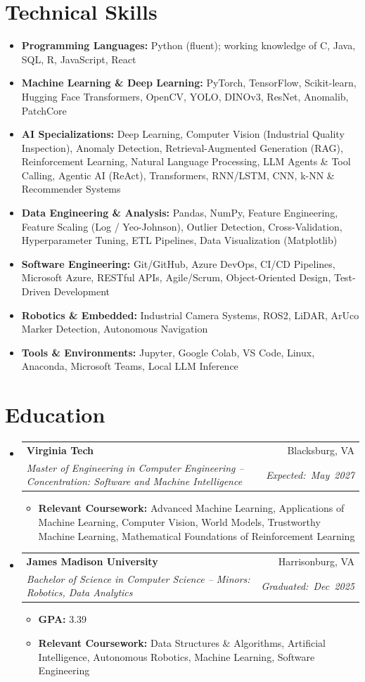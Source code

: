 \documentclass[letterpaper,10pt]{article}
\makeatletter
\newcommand{\resumeItem}[1]{\item\small{#1}}
\newcommand{\resumeSubheading}[4]{
  \vspace{1pt}\item
    \begin{tabular*}{\textwidth}[t]{@{}l@{\extracolsep{\fill}}r@{}}
      \textbf{#1} & #2 \\
      \textit{\small #3} & \textit{\small\mbox{#4}} \\
    \end{tabular*}\vspace{-2pt}
}
\newcommand{\resumeSubHeadingListStart}{\begin{itemize}[leftmargin=0pt, label={}, itemsep=0pt, parsep=0pt]}
\newcommand{\resumeSubHeadingListEnd}{\end{itemize}}
\newcommand{\resumeItemListStart}{\begin{itemize}[leftmargin=0.18in, itemsep=0pt, parsep=0pt, topsep=4pt]}
\newcommand{\resumeItemListEnd}{\end{itemize}\vspace{-4pt}}
\makeatother
\begin{document}
\section{Technical Skills}
\small
\begin{itemize}[leftmargin=0.15in, itemsep=0pt, parsep=0pt, topsep=1pt, label={}]
    \item \textbf{Programming Languages:} Python (fluent); working knowledge of C, Java, SQL, R, JavaScript, React
    \item \textbf{Machine Learning \& Deep Learning:} PyTorch, TensorFlow, Scikit-learn, Hugging Face Transformers, OpenCV, YOLO, DINOv3, ResNet, Anomalib, PatchCore
    \item \textbf{AI Specializations:} Deep Learning, Computer Vision (Industrial Quality Inspection), Anomaly Detection, Retrieval-Augmented Generation (RAG), Reinforcement Learning, Natural Language Processing, LLM Agents \& Tool Calling, Agentic AI (ReAct), Transformers, RNN/LSTM, CNN, k-NN \& Recommender Systems
    \item \textbf{Data Engineering \& Analysis:} Pandas, NumPy, Feature Engineering, Feature Scaling (Log / Yeo-Johnson), Outlier Detection, Cross-Validation, Hyperparameter Tuning, ETL Pipelines, Data Visualization (Matplotlib)
    \item \textbf{Software Engineering:} Git/GitHub, Azure DevOps, CI/CD Pipelines, Microsoft Azure, RESTful APIs, Agile/Scrum, Object-Oriented Design, Test-Driven Development
    \item \textbf{Robotics \& Embedded:} Industrial Camera Systems, ROS2, LiDAR, ArUco Marker Detection, Autonomous Navigation
    \item \textbf{Tools \& Environments:} Jupyter, Google Colab, VS Code, Linux, Anaconda, Microsoft Teams, Local LLM Inference
\end{itemize}

\section{Education}
\resumeSubHeadingListStart
    \resumeSubheading
      {Virginia Tech}{Blacksburg, VA}
      {Master of Engineering in Computer Engineering -- Concentration: Software and Machine Intelligence}{Expected: May 2027}
      \resumeItemListStart
        \resumeItem{\textbf{Relevant Coursework:} Advanced Machine Learning, Applications of Machine Learning, Computer Vision, World Models, Trustworthy Machine Learning, Mathematical Foundations of Reinforcement Learning}
      \resumeItemListEnd
    \resumeSubheading
      {James Madison University}{Harrisonburg, VA}
      {Bachelor of Science in Computer Science -- Minors: Robotics, Data Analytics}{Graduated: Dec 2025}
      \resumeItemListStart
        \resumeItem{\textbf{GPA:} 3.39}
        \resumeItem{\textbf{Relevant Coursework:} Data Structures \& Algorithms, Artificial Intelligence, Autonomous Robotics, Machine Learning, Software Engineering}
      \resumeItemListEnd
\resumeSubHeadingListEnd
\end{document}
